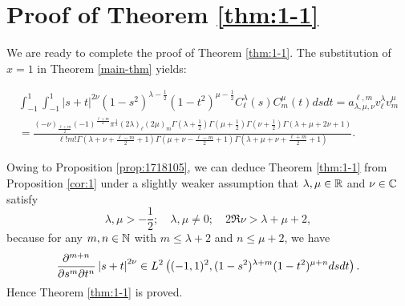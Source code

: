 \section{Proof of Theorem \ref{thm:1-1}}\label{sec:pfThm}
We are ready to complete the proof of Theorem \ref{thm:1-1}.
The substitution of $x = 1$ in Theorem \ref{main-thm} yields:
\begin{proposition}
  \label{cor:1}{\tmdummy}
  
    \begin{multline}
    \displaystyle\int_{- 1}^1 \displaystyle\int_{- 1}^1 | s + t |^{2 \nu} (1 - s^2)^{\lambda -
    \frac{1}{2}} (1 - t^2)^{\mu - \frac{1}{2}} C_{\ell}^{\lambda} (s)
    C_m^{\mu} (t) d s d t   =a^{\ell,m}_{\lambda,\mu,\nu}v_\ell^\lambda v^\mu_m\\
    \displaystyle = \frac{(- \nu)_{\frac{\ell + m}{2}} (- 1)^{\frac{\ell + m}{2}}
    \pi^{\frac{1}{2}} (2 \lambda)_{\ell} (2 \mu)_m \Gamma \left( \lambda +
    \frac{1}{2} \right) \Gamma \left( \mu + \frac{1}{2} \right) \Gamma \left(
    \nu + \frac{1}{2} \right) \Gamma (\lambda + \mu + 2 \nu + 1)}{\ell !m!
    \Gamma \left( \lambda + \nu + \frac{\ell - m}{2} + 1 \right) \Gamma \left(
    \mu + \nu - \frac{\ell - m}{2} + 1 \right) \Gamma \left( \lambda + \mu +
    \nu + \frac{\ell + m}{2} + 1 \right)}  \label{eqn:cor:1} .
  \end{multline}
\end{proposition}
Owing to Proposition \ref{prop:1718105}, we can deduce
Theorem \ref{thm:1-1}
from Proposition \ref{cor:1}
under a slightly weaker assumption that $\lambda,\mu\in\mathbb{R}$ and $\nu\in\mathbb{C}$ satisfy\begin{equation*}
	\lambda,\mu>-\frac{1}{2};\quad\lambda,\mu\neq0;\quad2\Re \nu>\lambda+\mu+2,
\end{equation*}because for any $m,n\in\mathbb{N}$ with $m\le\lambda+2$ and $n\le\mu+2$, we have\begin{equation*}
	\frac{\partial^{m+n}}{\partial s^m\partial t^n}\left|s+t\right|^{2\nu}\in L^2\left( (-1,1)^2,(1-s^2)^{\lambda+m}(1-t^2)^{\mu+n}dsdt \right).
\end{equation*}
Hence Theorem \ref{thm:1-1} is proved.
